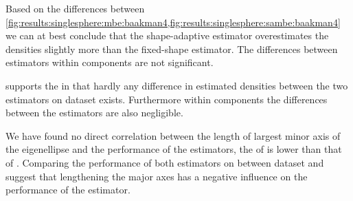 		Based on the differences between \cref{fig:results:singlesphere:mbe:baakman4,fig:results:singlesphere:sambe:baakman4} we can at best conclude that the shape-adaptive estimator overestimates the densities slightly more than the fixed-shape estimator. 
		The differences between estimators within components are not significant.

		 supports the \MSE in that hardly any difference in estimated densities between the two estimators on dataset \baakmanFive exists. 
		Furthermore within components the differences between the estimators are also negligible. 

		We have found no direct correlation between the length of largest minor axis of the eigenellipse and the performance of the estimators, \eg the \MSE of \baakmanFour is lower than that of \baakmanOne. 
		Comparing the performance of both estimators on between dataset \ferdosiOne and \baakmanFive suggest that lengthening the major axes has a negative influence on the performance of the estimator. 

